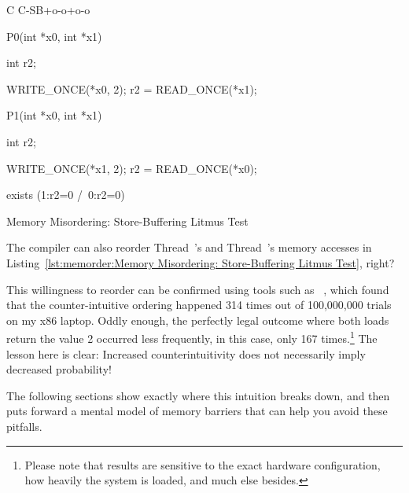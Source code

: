 \begin{listing}[tbp]
{ \scriptsize
\begin{verbbox}[\LstLineNo]
C C-SB+o-o+o-o
{
}

P0(int *x0, int *x1)
{
  int r2;

  WRITE_ONCE(*x0, 2);
  r2 = READ_ONCE(*x1);
}


P1(int *x0, int *x1)
{
  int r2;

  WRITE_ONCE(*x1, 2);
  r2 = READ_ONCE(*x0);
}

exists (1:r2=0 /\ 0:r2=0)
\end{verbbox}
}
\centering
\theverbbox
\caption{Memory Misordering: Store-Buffering Litmus Test}
\label{lst:memorder:Memory Misordering: Store-Buffering Litmus Test}
\end{listing}

\QuickQuiz{}
	The compiler can also reorder Thread~'s and
	Thread~'s memory accesses in
	Listing~\ref{lst:memorder:Memory Misordering: Store-Buffering Litmus Test},
	right?
 \QuickQuizEnd

This willingness to reorder can be confirmed using tools such as
~\cite{Alglave:2014:HCM:2594291.2594347},
which found that the counter-intuitive ordering happened
314 times out of 100,000,000 trials on my x86 laptop.
Oddly enough, the perfectly legal outcome where both loads return the
value 2 occurred less frequently, in this case, only 167 times.\footnote{
	Please note that results are sensitive to the exact hardware
	configuration,
	how heavily the system is loaded, and much else besides.}
The lesson here is clear: Increased counterintuitivity does not necessarily
imply decreased probability!

The following sections show exactly where this intuition breaks down,
and then puts forward a mental model of memory barriers that can help
you avoid these pitfalls.

